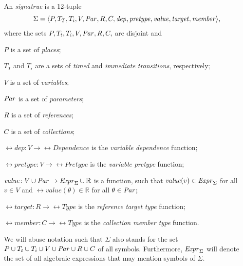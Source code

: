 \begin{dfn}
  An \emph{ signatrue} is a 12-tuple
  \begin{equation}
    \Sigma = \langle P, T_T, T_i, V, \textrm{\itshape Par\/}, R, C, \textrm{\itshape dep\/}, \textrm{\itshape pretype\/}, \textrm{\itshape value\/}, \textrm{\itshape target\/}, \textrm{\itshape member\/}\rangle \text,
  \end{equation}
  where the sets \(P, T_t, T_i, V, \textrm{\itshape Par\/}, R, C,\) are disjoint and
  \begin{compactitem}
  \item \(P\) is a set of \emph{places};
  \item \(T_T\) and \(T_i\) are a sets of \emph{timed} and \emph{immediate transitions}, respectively;
  \item \(V\) is a set of \emph{variables};
  \item \(\textrm{\itshape Par\/}\) is a set of \emph{parameters};
  \item \(R\) is a set of \emph{references};
  \item \(C\) is a set of \emph{collections};
  \item \(\rel{dep}\colon V \to \rel{Dependence}\) is the \emph{variable dependence} function;
  \item \(\rel{pretype}\colon V \to \rel{Pretype}\) is the \emph{variable pretype} function;
  \item \(\textrm{\itshape value\/}\colon V \cup \textrm{\itshape Par\/} \rightarrow \textrm{\itshape Expr\/}_\Sigma \cup \mathbb{R}\) is a function, such that \(\textrm{\itshape value\/}(v) \in \textrm{\itshape Expr\/}_\Sigma\) for all \(v \in V\) and \(\rel{value}(\theta) \in \mathbb{R}\) for all \(\theta \in \textrm{\itshape Par\/}\);
  \item \(\rel{target}\colon R \to \rel{Type}\) is the \emph{reference target type} function;
  \item \(\rel{member}\colon C \to \rel{Type}\) is the \emph{collection member type} function.
  \end{compactitem}
\end{dfn}

We will abuse notation such that \(\Sigma\) also stands for the set \(P \cup T_t \cup T_i \cup V \cup \textrm{\itshape Par\/} \cup R \cup C\) of all symbols. Furthermore, \(\textrm{\itshape Expr\/}_\Sigma\) will denote the set of all algebraic expressions that may mention symbols of \(\Sigma\).

